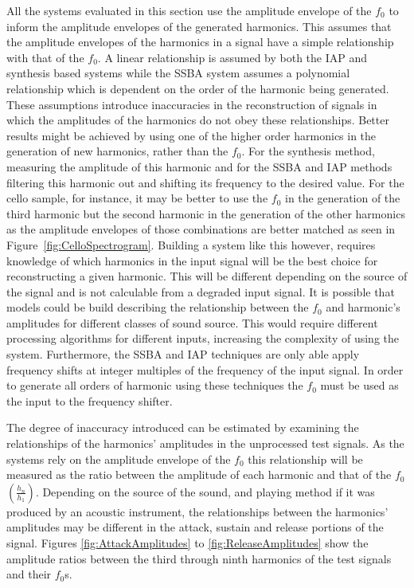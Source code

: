 		All the systems evaluated in this section use the amplitude envelope of the $f_{0}$ to inform the amplitude
		envelopes of the generated harmonics. This assumes that the amplitude envelopes of the harmonics in a
		signal have a simple relationship with that of the $f_{0}$. A linear relationship is assumed by both the
		IAP and synthesis based systems while the SSBA system assumes a polynomial relationship which is dependent
		on the order of the harmonic being generated. These assumptions introduce inaccuracies in the
		reconstruction of signals in which the amplitudes of the harmonics do not obey these relationships. Better
		results might be achieved by using one of the higher order harmonics in the generation of new harmonics,
		rather than the $f_{0}$. For the synthesis method, measuring the amplitude of this harmonic and for the
		SSBA and IAP methods filtering this harmonic out and shifting its frequency to the desired value. For the
		cello sample, for instance, it may be better to use the $f_{0}$ in the generation of the third harmonic but
		the second harmonic in the generation of the other harmonics as the amplitude envelopes of those
		combinations are better matched as seen in Figure~\ref{fig:CelloSpectrogram}. Building a system like this
		however, requires knowledge of which harmonics in the input signal will be the best choice for
		reconstructing a given harmonic. This will be different depending on the source of the signal and is not
		calculable from a degraded input signal. It is possible that models could be build describing the
		relationship between the $f_{0}$ and harmonic's amplitudes for different classes of sound source. This
		would require different processing algorithms for different inputs, increasing the complexity of using the
		system. Furthermore, the SSBA and IAP techniques are only able apply frequency shifts at integer multiples
		of the frequency of the input signal. In order to generate all orders of harmonic using these techniques
		the $f_{0}$ must be used as the input to the frequency shifter.
		
		The degree of inaccuracy introduced can be estimated by examining the relationships of the harmonics'
		amplitudes in the unprocessed test signals. As the systems rely on the amplitude envelope of the $f_{0}$
		this relationship will be measured as the ratio between the amplitude of each harmonic and that of the
		$f_{0}$ $\left(\frac{h_{n}}{h_{1}}\right)$. Depending on the source of the sound, and playing method if
		it was produced by an acoustic instrument, the relationships between the harmonics' amplitudes may be
		different in the attack, sustain and release portions of the signal. Figures \ref{fig:AttackAmplitudes} to
		\ref{fig:ReleaseAmplitudes} show the amplitude ratios between the third through ninth harmonics of the test
		signals and their $f_{0}$s.

